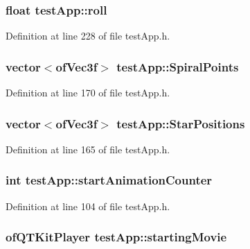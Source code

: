 \hypertarget{classtest_app_a020730abb55e6ae6d0a28edee19050e0}{
\subsubsection[{roll}]{\setlength{\rightskip}{0pt plus 5cm}float test\-App\-::roll}}\label{classtest_app_a020730abb55e6ae6d0a28edee19050e0}


Definition at line 228 of file test\-App.\-h.

\hypertarget{classtest_app_af0dd2f3e3aabdb43bee49d74c156dc05}{
\subsubsection[{Spiral\-Points}]{\setlength{\rightskip}{0pt plus 5cm}vector$<$of\-Vec3f$>$ test\-App\-::\-Spiral\-Points}}\label{classtest_app_af0dd2f3e3aabdb43bee49d74c156dc05}


Definition at line 170 of file test\-App.\-h.

\hypertarget{classtest_app_a68d0d30cea64a9d39a1b2deef16677ad}{
\subsubsection[{Star\-Positions}]{\setlength{\rightskip}{0pt plus 5cm}vector$<$of\-Vec3f$>$ test\-App\-::\-Star\-Positions}}\label{classtest_app_a68d0d30cea64a9d39a1b2deef16677ad}


Definition at line 165 of file test\-App.\-h.

\hypertarget{classtest_app_a577bf117cf10109de967ea0d3ca17f1f}{
\subsubsection[{start\-Animation\-Counter}]{\setlength{\rightskip}{0pt plus 5cm}int test\-App\-::start\-Animation\-Counter}}\label{classtest_app_a577bf117cf10109de967ea0d3ca17f1f}


Definition at line 104 of file test\-App.\-h.

\hypertarget{classtest_app_a9bfe7793fa0689a991ff64174745c38f}{
\subsubsection[{starting\-Movie}]{\setlength{\rightskip}{0pt plus 5cm}of\-Q\-T\-Kit\-Player test\-App\-::starting\-Movie}}\label{classtest_app_a9bfe7793fa0689a991ff64174745c38f}


